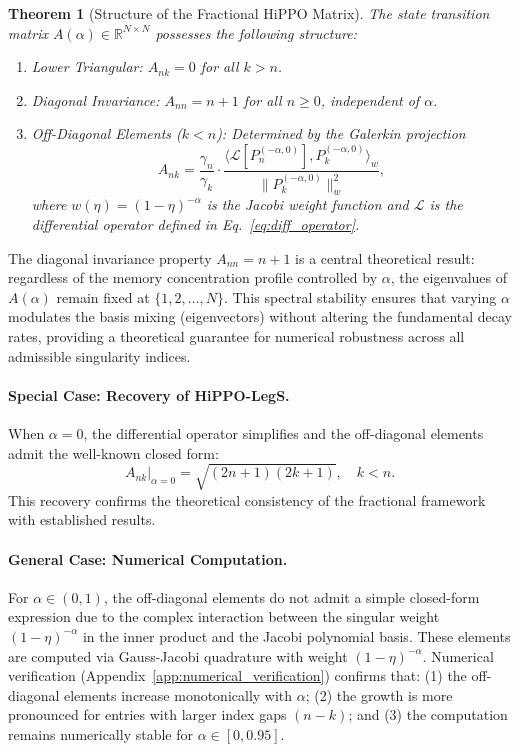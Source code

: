 \documentclass{article}
\theoremstyle{plain}
\newtheorem{theorem}{Theorem}[section]
\theoremstyle{definition}
\theoremstyle{remark}
\begin{document}
\begin{theorem}[Structure of the Fractional HiPPO Matrix]
	\label{thm:A_structure}
	The state transition matrix $A(\alpha) \in \mathbb{R}^{N \times N}$ possesses the following structure:
	\begin{enumerate}
		\item Lower Triangular: $A_{nk} = 0$ for all $k > n$.
		\item Diagonal Invariance: $A_{nn} = n + 1$ for all $n \geq 0$, independent of $\alpha$.
		\item Off-Diagonal Elements ($k < n$): Determined by the Galerkin projection
		\begin{equation}
			A_{nk} = \frac{\gamma_n}{\gamma_k} \cdot \frac{\langle \mathcal{L}[P_n^{(-\alpha,0)}], P_k^{(-\alpha,0)} \rangle_w}{\| P_k^{(-\alpha,0)} \|_w^2},
			\label{eq:A_offdiag}
		\end{equation}
		where $w(\eta) = (1-\eta)^{-\alpha}$ is the Jacobi weight function and $\mathcal{L}$ is the differential operator defined in Eq.~\eqref{eq:diff_operator}.
	\end{enumerate}
\end{theorem}

The diagonal invariance property $A_{nn} = n+1$ is a central theoretical result: regardless of the memory concentration profile controlled by $\alpha$, the eigenvalues of $A(\alpha)$ remain fixed at $\{1, 2, \ldots, N\}$. This spectral stability ensures that varying $\alpha$ modulates the basis mixing (eigenvectors) without altering the fundamental decay rates, providing a theoretical guarantee for numerical robustness across all admissible singularity indices.

\paragraph{Special Case: Recovery of HiPPO-LegS.}
When $\alpha = 0$, the differential operator simplifies and the off-diagonal elements admit the well-known closed form:
\begin{equation}
	A_{nk}\big|_{\alpha=0} = \sqrt{(2n+1)(2k+1)}, \quad k < n.
	\label{eq:A_legs}
\end{equation}
This recovery confirms the theoretical consistency of the fractional framework with established results.

\paragraph{General Case: Numerical Computation.}
For $\alpha \in (0, 1)$, the off-diagonal elements do not admit a simple closed-form expression due to the complex interaction between the singular weight $(1-\eta)^{-\alpha}$ in the inner product and the Jacobi polynomial basis. These elements are computed via Gauss-Jacobi quadrature with weight $(1-\eta)^{-\alpha}$. Numerical verification (Appendix~\ref{app:numerical_verification}) confirms that: (1) the off-diagonal elements increase monotonically with $\alpha$; (2) the growth is more pronounced for entries with larger index gaps $(n - k)$; and (3) the computation remains numerically stable for $\alpha \in [0, 0.95]$.
\end{document}
